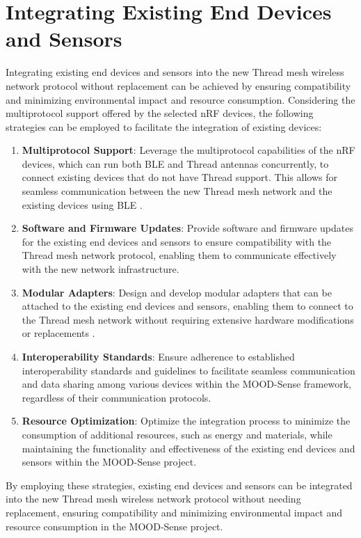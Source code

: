 \section{Integrating Existing End Devices and Sensors}

Integrating existing end devices and sensors into the new Thread mesh wireless network protocol without replacement can be achieved by ensuring compatibility and minimizing environmental impact and resource consumption. Considering the multiprotocol support offered by the selected nRF devices, the following strategies can be employed to facilitate the integration of existing devices:

\begin{enumerate}
    \item \textbf{Multiprotocol Support}: Leverage the multiprotocol capabilities of the nRF devices, which can run both BLE and Thread antennas concurrently, to connect existing devices that do not have Thread support. This allows for seamless communication between the new Thread mesh network and the existing devices using BLE \cite{nordic_multiprotocol_support}.
    \item \textbf{Software and Firmware Updates}: Provide software and firmware updates for the existing end devices and sensors to ensure compatibility with the Thread mesh network protocol, enabling them to communicate effectively with the new network infrastructure.
    \item \textbf{Modular Adapters}: Design and develop modular adapters that can be attached to the existing end devices and sensors, enabling them to connect to the Thread mesh network without requiring extensive hardware modifications or replacements \cite{6916657}.
    \item \textbf{Interoperability Standards}: Ensure adherence to established interoperability standards and guidelines to facilitate seamless communication and data sharing among various devices within the MOOD-Sense framework, regardless of their communication protocols.
    \item \textbf{Resource Optimization}: Optimize the integration process to minimize the consumption of additional resources, such as energy and materials, while maintaining the functionality and effectiveness of the existing end devices and sensors within the MOOD-Sense project.
\end{enumerate}

By employing these strategies, existing end devices and sensors can be integrated into the new Thread mesh wireless network protocol without needing replacement, ensuring compatibility and minimizing environmental impact and resource consumption in the MOOD-Sense project.
